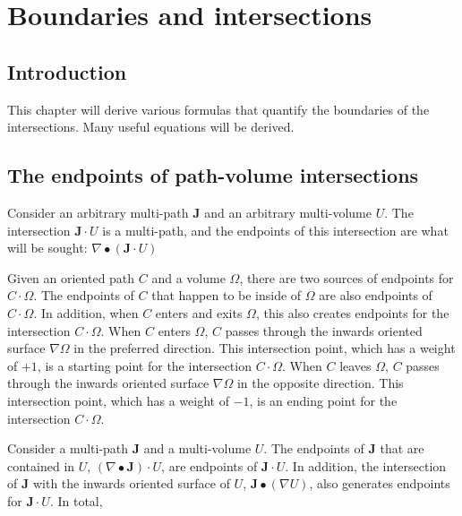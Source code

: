 


\chapter{Boundaries and intersections}\label{chap:boundaries_and_intersections} 


\section{Introduction}

This chapter will derive various formulas that quantify the boundaries of the intersections. Many useful equations will be derived.


\section{The endpoints of path-volume intersections}\label{sec:endpoints_of_path_volume_intersect}

Consider an arbitrary multi-path \(\mathbf{J}\) and an arbitrary multi-volume \(U\). The intersection \(\mathbf{J} \cdot U\) is a multi-path, and the endpoints of this intersection are what will be sought: \(\nabla \bullet (\mathbf{J} \cdot U)\) 

Given an oriented path \(C\) and a volume \(\Omega\), there are two sources of endpoints for \(C \cdot \Omega\). The endpoints of \(C\) that happen to be inside of \(\Omega\) are also endpoints of \(C \cdot \Omega\). In addition, when \(C\) enters and exits \(\Omega\), this also creates endpoints for the intersection \(C \cdot \Omega\). When \(C\) enters \(\Omega\), \(C\) passes through the inwards oriented surface \(\nabla \Omega\) in the preferred direction. This intersection point, which has a weight of \(+1\), is a starting point for the intersection \(C \cdot \Omega\). When \(C\) leaves \(\Omega\), \(C\) passes through the inwards oriented surface \(\nabla \Omega\) in the opposite direction. This intersection point, which has a weight of \(-1\), is an ending point for the intersection \(C \cdot \Omega\).   

Consider a multi-path \(\mathbf{J}\) and a multi-volume \(U\). The endpoints of \(\mathbf{J}\) that are contained in \(U\), \((\nabla \bullet \mathbf{J}) \cdot U\), are endpoints of \(\mathbf{J} \cdot U\). In addition, the intersection of \(\mathbf{J}\) with the inwards oriented surface of \(U\), \(\mathbf{J} \bullet (\nabla U)\), also generates endpoints for \(\mathbf{J} \cdot U\). In total,  

